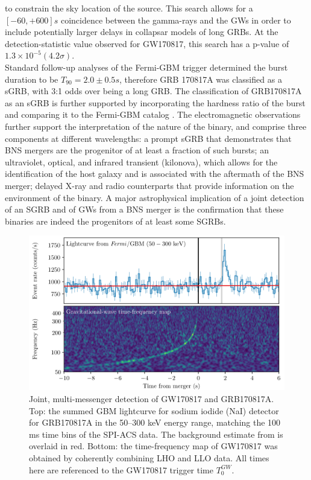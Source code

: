 \documentclass[binding=0.6cm, LaM]{sapthesis}
\begin{document}
	to constrain the sky location of the source. This search allows for a $[-60, +600] s$ 
	coincidence between the gamma-rays and the GWs in order to include potentially 
	larger delays in collapsar models of long GRBs. 
	At the detection-statistic value observed for GW170817, this search has a p-value of $1.3\times 10^{-5} (4.2\sigma)$. \\ 
	Standard follow-up analyses \cite{108,110} of the Fermi-GBM trigger 
	determined the burst duration to be $T_{90} = 2.0 \pm 0.5 s$,
	therefore GRB 170817A was classified as a sGRB, with 3:1 odds over being a long GRB. 
	The classification of GRB170817A as an sGRB is further supported by incorporating 
	the hardness ratio of the burst and comparing it to the Fermi-GBM catalog \cite{110}. 
	The electromagnetic observations further support the interpretation of the nature of the binary, 
	and comprise three components at different wavelengths: a prompt sGRB that demonstrates 
	that BNS mergers are the progenitor of at least a fraction of such bursts; an ultraviolet, optical, 
	and infrared transient (kilonova), which allows for the identification of the host galaxy 
	and is associated with the aftermath of the BNS merger; 
	delayed X-ray and radio counterparts that provide information on the environment of the binary. 
	A major astrophysical implication of a joint detection of an SGRB and of GWs from a BNS merger 
	is the confirmation that these binaries are indeed the progenitors of at least some SGRBs. 
		\begin{figure}[H]
                        \label{gw-grb}
                        \includegraphics[scale=0.45]{gw-grb}
                        \centering
                        \caption{Joint, multi-messenger detection of GW170817 and GRB170817A. 
				 Top: the summed GBM lightcurve for sodium iodide (NaI) detector
				 for GRB170817A in the 50–300 keV energy range, 
				 matching the 100 ms time bins of the SPI-ACS data. 
				 The background estimate from \cite{110} 
				 is overlaid in red.   
                                 Bottom: the time-frequency map of GW170817 was obtained by coherently 
				 combining LHO and LLO data. All times here are referenced to the GW170817 
				 trigger time $T_0^{GW}$. \cite{55}}
                        \label{fig:gw-grb}
                \end{figure}
\end{document}

